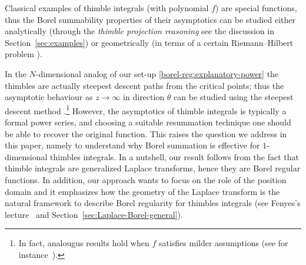\documentclass{article}
\theoremstyle{definition}
\theoremstyle{plain}
\begin{document}
Classical examples of thimble integrals (with polynomial $f$) are special functions, thus the Borel summability properties of their asymptotics can be studied either analytically (through the \textit{thimble projection reasoning} see the discussion in Section~\ref{sec:examples}) or geometrically (in terms of a certain Riemann--Hilbert problem \cite{Maxim_slide_ERC}\cite[Section 6.2]{kontsevich2022analyticity}). 


In the $N$-dimensional analog of our set-up \ref{borel-reg:explanatory-power} the thimbles are actually steepest descent paths from the critical points; thus the asymptotic behaviour as $z \to \infty$ in direction $\theta$ can be studied using the steepest descent method \cite{andersen2020resurgence,delabaere-howls,delabaere_dillinger_pham,Delabaere-Pham99,dingle1973asymptotic,Malgrange22,Pham83}.\footnote{In fact, analougus results hold when $f$ satisfies milder assumptions (see for instance~\cite[Section 1.2.2]{mistegard_phdthesis}).} However, the asymptotics of thimble integrals is typically a formal power series, and choosing a suitable resummation technique one should be able to recover the original function. This raises the question we address in this paper, namely to understand why Borel summation is effective for $1$-dimensional thimbles integrals. In a nutshell, our result follows from the fact that thimble integrals are generalized Laplace transforms, hence they are Borel regular functions. In addition, our approach wants to focus on the role of the position domain and it emphasizes how the geometry of the Laplace transform is the natural framework to describe Borel regularity for thimbles integrals (see Fenyes's lecture~\cite{Fenyes-ihes-lecture} and Section~\ref{sec:Laplace-Borel-general}).   



%     
\end{document}
